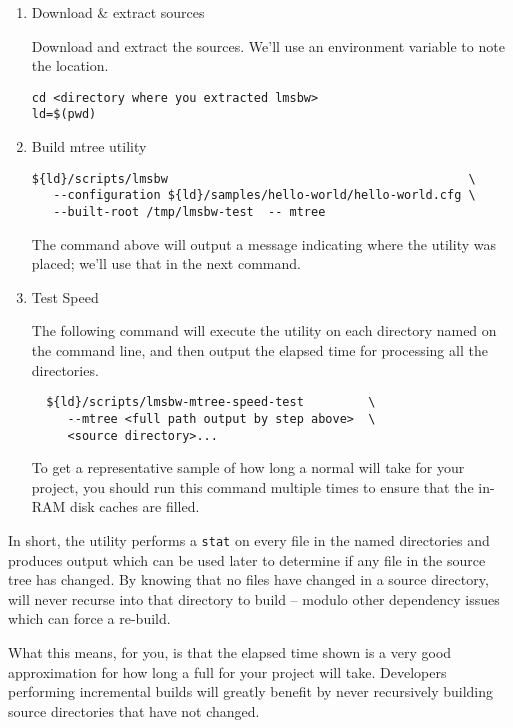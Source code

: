 \begin{enumerate}
\item Download \& extract \lmsbw sources

  Download and extract the sources.  We'll use an environment variable
  to note the location.

\begin{verbatim}
cd <directory where you extracted lmsbw>
ld=$(pwd)
\end{verbatim}
\item Build mtree utility
\begin{verbatim}
${ld}/scripts/lmsbw                                          \
   --configuration ${ld}/samples/hello-world/hello-world.cfg \
   --built-root /tmp/lmsbw-test  -- mtree
\end{verbatim}

The command above will output a message indicating where the \mtree
utility was placed; we'll use that in the next command.

\item Test Speed

  The following command will execute the \mtree utility on each
  directory named on the command line, and then output the elapsed
  time for processing all the directories.

\begin{verbatim}
  ${ld}/scripts/lmsbw-mtree-speed-test         \
     --mtree <full path output by step above>  \
     <source directory>...
\end{verbatim}

To get a representative sample of how long a normal \nullbuild will
take for your project, you should run this command multiple times to
ensure that the in-RAM disk caches are filled.

\end{enumerate}

In short, the \mtree utility performs a \texttt{stat} on every file in
the named directories and produces output which can be used later to
determine if any file in the source tree has changed.  By knowing that
no files have changed in a source directory, \lmsbw will never recurse
into that directory to build -- modulo other dependency issues which
can force a re-build.

What this means, for you, is that the elapsed time shown is a very
good approximation for how long a full \nullbuild for your project
will take.  Developers performing incremental builds will greatly
benefit by never recursively building source directories that have not
changed.

